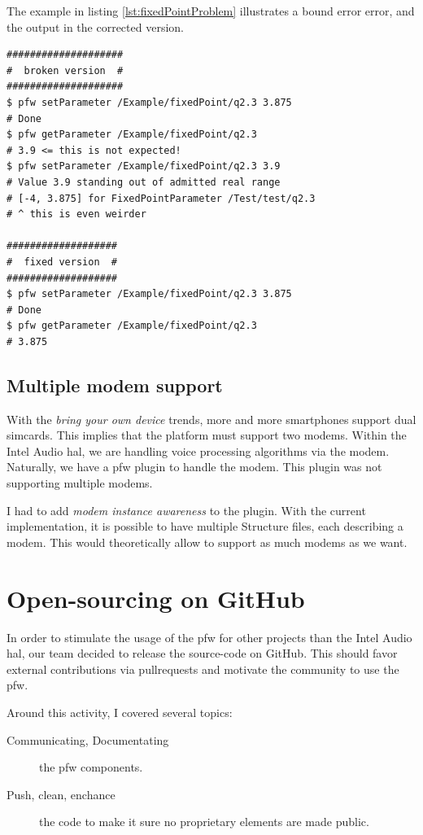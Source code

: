 The example in listing \ref {lst:fixedPointProblem} illustrates a bound error error, and the output in the corrected version.
\begin{lstlisting}[caption=$Q.2.3$ rounding issue example, label=lst:fixedPointProblem]
####################
#  broken version  #
####################
$ pfw setParameter /Example/fixedPoint/q2.3 3.875
# Done
$ pfw getParameter /Example/fixedPoint/q2.3
# 3.9 <= this is not expected!
$ pfw setParameter /Example/fixedPoint/q2.3 3.9
# Value 3.9 standing out of admitted real range
# [-4, 3.875] for FixedPointParameter /Test/test/q2.3
# ^ this is even weirder

###################
#  fixed version  #
###################
$ pfw setParameter /Example/fixedPoint/q2.3 3.875
# Done
$ pfw getParameter /Example/fixedPoint/q2.3
# 3.875
\end{lstlisting}


\subsection{Multiple modem support}
With the \emph{bring your own device} trends, more and more smartphones support dual simcards. This implies that the platform must support two modems.
Within the Intel Audio \gls{hal}, we are handling voice processing algorithms via the modem.
Naturally, we have a \gls{pfw} plugin to handle the modem. This plugin was not supporting multiple modems.

I had to add \emph{modem instance awareness} to the plugin. With the current implementation, it
is possible to have multiple Structure files, each describing a modem. This would theoretically allow
to support as much modems as we want.

\section{Open-sourcing on GitHub}
In order to stimulate the usage of the \gls{pfw} for other projects than the Intel Audio \gls{hal},
our team decided to release the source-code on \gls{GitHub}.
This should favor external contributions via \gls{pullrequests} and motivate
the community to use the \gls{pfw}.

Around this activity, I covered several topics:
\begin{description}
    \item[Communicating, Documentating] the \gls{pfw} components.
    \item[Push, clean, enchance] the code to make it sure no proprietary
        elements are made public.
\end{description}


